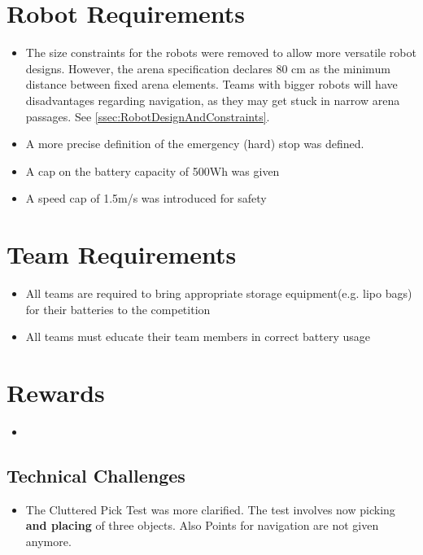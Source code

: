 \section{Robot Requirements}
\begin{itemize}
  \item The size constraints for the robots were removed to allow more versatile robot designs. 
  		However, the arena specification declares 80 cm as the minimum distance between fixed arena elements.
  		Teams with bigger robots will have disadvantages regarding navigation, as they may get stuck in narrow arena passages. 
  		See \ref{ssec:RobotDesignAndConstraints}.
  \item A more precise definition of the emergency (hard) stop was defined.
  \item A cap on the battery capacity of 500Wh was given
  \item A speed cap of 1.5m/s was introduced for safety
\end{itemize}

\section{Team Requirements}
\begin{itemize}
  \item All teams are required to bring appropriate storage equipment(e.g. lipo bags) for their batteries to the competition
  \item All teams must educate their team members in correct battery usage 
\end{itemize}

\section{Rewards}
\begin{itemize}
  \item
\end{itemize}

\subsection{Technical Challenges}
\begin{itemize}
  \item The Cluttered Pick Test was more clarified. The test involves now picking \textbf{and placing} of three objects. Also Points for navigation are not given anymore. 
\end{itemize}
